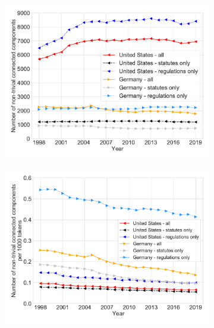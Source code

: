 \documentclass[varwidth, border=0pt]{standalone}
\begin{document}
	
	\begin{figure}\centering
		\begin{subfigure}{0.5\linewidth}
			\includegraphics[width=\linewidth]{../../graphics/connectivity-number-of-components-comparison.pdf}
		\end{subfigure}%
		\begin{subfigure}{0.5\linewidth}
			\includegraphics[width=\linewidth]{../../graphics/connectivity-number-of-components-comparison-rel.pdf}
		\end{subfigure}
	\end{figure}
	
\end{document}
